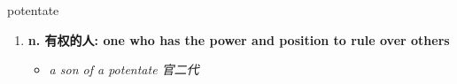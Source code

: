 
\begin{frame}
{\huge potentate}
\begin{center}
\begin{enumerate}\Large
  \item \textbf{n. 有权的人: one who has the power and position to rule over others}
  \begin{itemize}
    \item \em{\Large{a son of a potentate 官二代}}
  \end{itemize}
\end{enumerate}
\end{center}
\end{frame}
